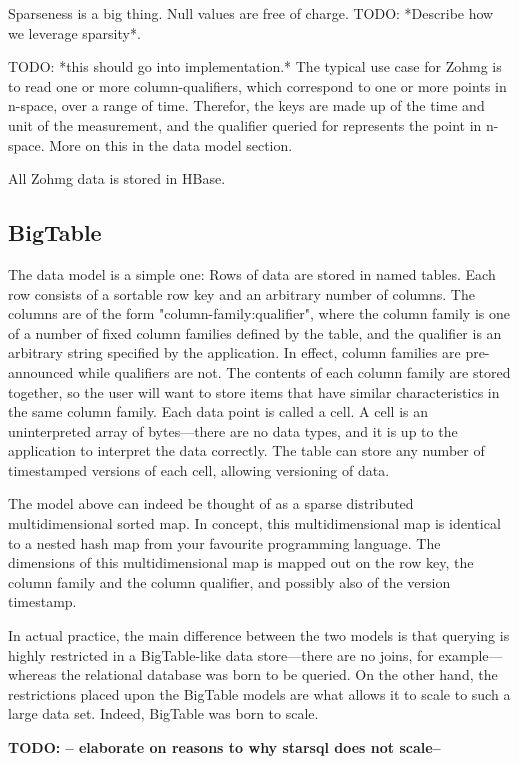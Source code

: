 \documentclass[a4paper,10pt]{book}
\begin{document}
Sparseness is a big thing. Null values are free of charge. TODO: *Describe
how we leverage sparsity*.

TODO: *this should go into implementation.*
The typical use case for Zohmg is to read one or more column-qualifiers,
which correspond to one or more points in n-space, over a range of time.
Therefor, the keys are made up of the time and unit of the measurement,
and the qualifier queried for represents the point in n-space. More on
this in the data model section.

All Zohmg data is stored in HBase.


\subsection{BigTable}

The data model is a simple one: Rows of data are stored in named tables.
Each row consists of a sortable row key and an arbitrary number of columns.
The columns are of the form "column-family:qualifier", where the column
family is one of a number of fixed column families defined by the table,
and the qualifier is an arbitrary string specified by the application. In
effect, column families are pre-announced while qualifiers are not. The
contents of each column family are stored together, so the user will want
to store items that have similar characteristics in the same column family.
Each data point is called a cell. A cell is an uninterpreted array of
bytes---there are no data types, and it is up to the application to
interpret the data correctly. The table can store any number of timestamped
versions of each cell, allowing versioning of data.

The model above can indeed be thought of as a sparse distributed
multidimensional sorted map. In concept, this multidimensional map is
identical to a nested hash map from your favourite programming language. The
dimensions of this multidimensional map is mapped out on the row key, the
column family and the column qualifier, and possibly also of the version
timestamp.

In actual practice, the main difference between the two models is that
querying is highly restricted in a BigTable-like data store---there are no
joins, for example---whereas the relational database was born to be queried.
On the other hand, the restrictions placed upon the BigTable models are
what allows it to scale to such a large data set. Indeed, BigTable was born
to scale.

\textbf{TODO: -- elaborate on reasons to why starsql does not scale--}
\end{document}
